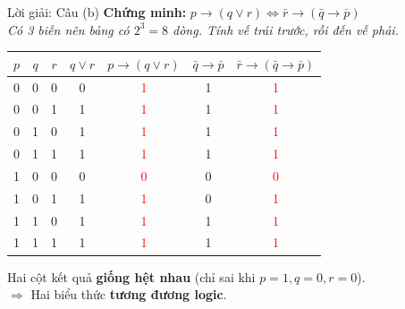 \documentclass[aspectratio=169, 11pt]{beamer}
\begin{document}
\begin{frame}{Lời giải: Câu (b)}
\textbf{Chứng minh:} $p \rightarrow (q \lor r) \Leftrightarrow \bar{r} \rightarrow (\bar{q} \rightarrow \bar{p})$\\
\textit{Có 3 biến nên bảng có $2^3 = 8$ dòng. Tính vế trái trước, rồi đến vế phải.}

\vspace{0.15cm}
\begin{center}
\small
\begin{tabular}{|c|c|c||c|c||c|c|}
\hline
$p$ & $q$ & $r$ & $q \lor r$ & $p \rightarrow (q \lor r)$ & $\bar{q} \rightarrow \bar{p}$ & $\bar{r} \rightarrow (\bar{q} \rightarrow \bar{p})$ \\
\hline
0 & 0 & 0 & 0 & \textcolor{red}{1} & 1 & \textcolor{red}{1} \\
\hline
0 & 0 & 1 & 1 & \textcolor{red}{1} & 1 & \textcolor{red}{1} \\
\hline
0 & 1 & 0 & 1 & \textcolor{red}{1} & 1 & \textcolor{red}{1} \\
\hline
0 & 1 & 1 & 1 & \textcolor{red}{1} & 1 & \textcolor{red}{1} \\
\hline
1 & 0 & 0 & 0 & \textcolor{red}{0} & 0 & \textcolor{red}{0} \\
\hline
1 & 0 & 1 & 1 & \textcolor{red}{1} & 0 & \textcolor{red}{1} \\
\hline
1 & 1 & 0 & 1 & \textcolor{red}{1} & 1 & \textcolor{red}{1} \\
\hline
1 & 1 & 1 & 1 & \textcolor{red}{1} & 1 & \textcolor{red}{1} \\
\hline
\end{tabular}
\end{center}

\vspace{0.15cm}
Hai cột kết quả \textbf{giống hệt nhau} (chỉ sai khi $p = 1, q = 0, r = 0$).\\
$\Rightarrow$ Hai biểu thức \textbf{tương đương logic}.
\end{frame}
\end{document}
